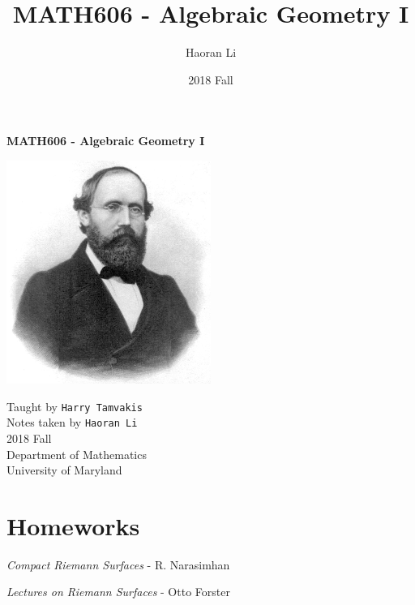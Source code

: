 \documentclass[a4paper,10pt]{article}
\title{MATH606 - Algebraic Geometry I}
\author{Haoran Li}
\date{2018 Fall}
\begin{document}
\sloppy %

\begin{titlepage}
\begin{center}
\vspace*{1cm}
\LARGE
\textbf{MATH606 - Algebraic Geometry I} \\
\vspace{2cm}
\begin{center}
\includegraphics[width=0.5\textwidth]{Pictures/Georg_Friedrich_Bernhard_Riemann.jpeg}
\end{center}
\vspace{2cm}
\normalsize
Taught by \texttt{Harry Tamvakis} \\
Notes taken by \texttt{Haoran Li} \\
2018 Fall \\
\vspace{2cm}
Department of Mathematics\\
University of Maryland\\
\end{center}
\end{titlepage}

\tableofcontents
\newpage

\section{Homeworks}


\begin{thebibliography}{}

\textit{Compact Riemann Surfaces} - R. Narasimhan

\textit{Lectures on Riemann Surfaces} - Otto Forster

\end{thebibliography}

\printindex
\newpage
\end{document}
